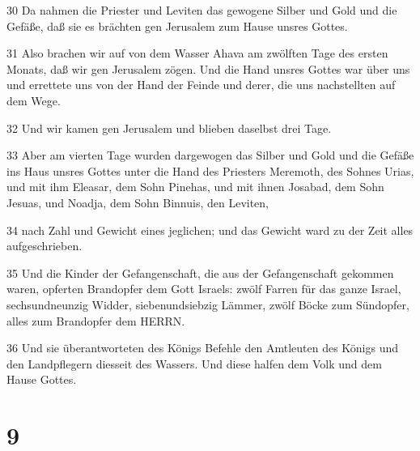 \par 30 Da nahmen die Priester und Leviten das gewogene Silber und Gold und die Gefäße, daß sie es brächten gen Jerusalem zum Hause unsres Gottes.
\par 31 Also brachen wir auf von dem Wasser Ahava am zwölften Tage des ersten Monats, daß wir gen Jerusalem zögen. Und die Hand unsres Gottes war über uns und errettete uns von der Hand der Feinde und derer, die uns nachstellten auf dem Wege.
\par 32 Und wir kamen gen Jerusalem und blieben daselbst drei Tage.
\par 33 Aber am vierten Tage wurden dargewogen das Silber und Gold und die Gefäße ins Haus unsres Gottes unter die Hand des Priesters Meremoth, des Sohnes Urias, und mit ihm Eleasar, dem Sohn Pinehas, und mit ihnen Josabad, dem Sohn Jesuas, und Noadja, dem Sohn Binnuis, den Leviten,
\par 34 nach Zahl und Gewicht eines jeglichen; und das Gewicht ward zu der Zeit alles aufgeschrieben.
\par 35 Und die Kinder der Gefangenschaft, die aus der Gefangenschaft gekommen waren, opferten Brandopfer dem Gott Israels: zwölf Farren für das ganze Israel, sechsundneunzig Widder, siebenundsiebzig Lämmer, zwölf Böcke zum Sündopfer, alles zum Brandopfer dem HERRN.
\par 36 Und sie überantworteten des Königs Befehle den Amtleuten des Königs und den Landpflegern diesseit des Wassers. Und diese halfen dem Volk und dem Hause Gottes.

\chapter{9}

